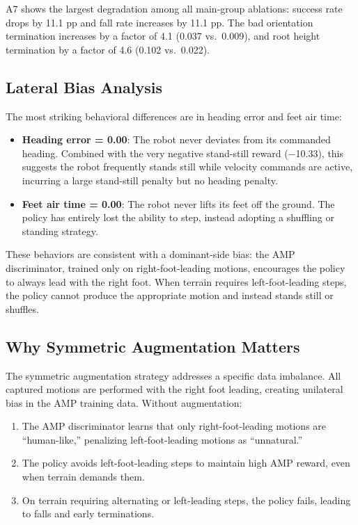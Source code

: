 A7 shows the largest degradation among all main-group ablations: success rate drops by 11.1 pp and fall rate increases by 11.1 pp. The bad orientation termination increases by a factor of 4.1 (0.037 vs.\ 0.009), and root height termination by a factor of 4.6 (0.102 vs.\ 0.022).

\subsection{Lateral Bias Analysis}

The most striking behavioral differences are in heading error and feet air time:

\begin{itemize}
    \item \textbf{Heading error = 0.00}: The robot never deviates from its commanded heading. Combined with the very negative stand-still reward ($-$10.33), this suggests the robot frequently stands still while velocity commands are active, incurring a large stand-still penalty but no heading penalty.
    \item \textbf{Feet air time = 0.00}: The robot never lifts its feet off the ground. The policy has entirely lost the ability to step, instead adopting a shuffling or standing strategy.
\end{itemize}

These behaviors are consistent with a dominant-side bias: the AMP discriminator, trained only on right-foot-leading motions, encourages the policy to always lead with the right foot. When terrain requires left-foot-leading steps, the policy cannot produce the appropriate motion and instead stands still or shuffles.

\subsection{Why Symmetric Augmentation Matters}

The symmetric augmentation strategy addresses a specific data imbalance. All captured motions are performed with the right foot leading, creating unilateral bias in the AMP training data. Without augmentation:

\begin{enumerate}
    \item The AMP discriminator learns that only right-foot-leading motions are ``human-like,'' penalizing left-foot-leading motions as ``unnatural.''
    \item The policy avoids left-foot-leading steps to maintain high AMP reward, even when terrain demands them.
    \item On terrain requiring alternating or left-leading steps, the policy fails, leading to falls and early terminations.
\end{enumerate}

